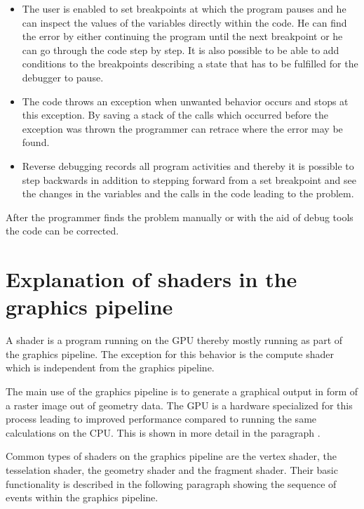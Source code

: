 \begin{itemize}

\item The user is enabled to set breakpoints at which the program pauses and he can inspect the values of the variables directly within the code. He can find the error by either continuing the program until the next breakpoint or he can go through the code step by step. It is also possible to be able to add conditions to the breakpoints describing a state that has to be fulfilled for the debugger to pause. 


\item The code throws an exception when unwanted behavior occurs and stops at this exception. By saving a stack of the calls which occurred before the exception was thrown the programmer can retrace where the error may be found.


\item Reverse debugging records all program activities and thereby it is possible to step backwards in addition to stepping forward from a set breakpoint and see the changes in the variables and the calls in the code leading to the problem.

\end{itemize}

After the programmer finds the problem manually or with the aid of debug tools the code can be corrected.

\section{Explanation of shaders in the graphics pipeline}
\label{section:explanationShadersPipeline}

A shader is a program running on the GPU thereby mostly running as part of the graphics pipeline. The exception for this behavior is the compute shader which is independent from the graphics pipeline.

The main use of the graphics pipeline is to generate a graphical output in form of a raster image out of geometry data. The GPU is a hardware specialized for this process leading to improved performance compared to running the same calculations on the CPU. This is shown in more detail in the paragraph .

Common types of shaders on the graphics pipeline are the vertex shader, the tesselation shader, the geometry shader and the fragment shader. Their basic functionality is described in the following paragraph showing the sequence of events within the graphics pipeline.

